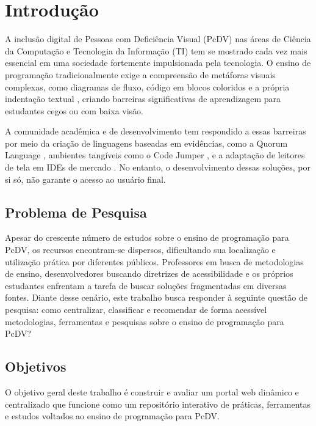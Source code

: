 \documentclass[12pt]{article}
\begin{document}
\section{Introdução}

A inclusão digital de Pessoas com Deficiência Visual (PcDV) nas áreas de Ciência da Computação e Tecnologia da Informação (TI) tem se mostrado cada vez mais essencial em uma sociedade fortemente impulsionada pela tecnologia. O ensino de programação tradicionalmente exige a compreensão de metáforas visuais complexas, como diagramas de fluxo, código em blocos coloridos e a própria indentação textual \cite{resnick2009scratch}, criando barreiras significativas de aprendizagem para estudantes cegos ou com baixa visão.

A comunidade acadêmica e de desenvolvimento tem respondido a essas barreiras por meio da criação de linguagens baseadas em evidências, como a Quorum Language \cite{stefik2019quorum}, ambientes tangíveis como o Code Jumper \cite{morrison2019physical}, e a adaptação de leitores de tela em IDEs de mercado \cite{seo2023coding}. No entanto, o desenvolvimento dessas soluções, por si só, não garante o acesso ao usuário final.

\subsection{Problema de Pesquisa}
Apesar do crescente número de estudos sobre o ensino de programação para PcDV, os recursos encontram-se dispersos, dificultando sua localização e utilização prática por diferentes públicos. Professores em busca de metodologias de ensino, desenvolvedores buscando diretrizes de acessibilidade e os próprios estudantes enfrentam a tarefa de buscar soluções fragmentadas em diversas fontes. Diante desse cenário, este trabalho busca responder à seguinte questão de pesquisa: como centralizar, classificar e recomendar de forma acessível metodologias, ferramentas e pesquisas sobre o ensino de programação para PcDV?

\subsection{Objetivos}
O objetivo geral deste trabalho é construir e avaliar um portal web dinâmico e centralizado que funcione como um repositório interativo de práticas, ferramentas e estudos voltados ao ensino de programação para PcDV.
\end{document}
